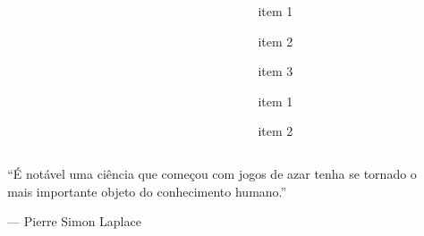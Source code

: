 \documentclass[
]{book}
\begin{document}
\begin{columns}

\begin{column}

\end{column}

\begin{column}

~

\end{column}

\begin{column}

item 1

item 2

item 3

item 1

item 2

\end{column}

\end{columns}

\begin{columns}

\begin{column}

\end{column}

\begin{column}

~

\end{column}

\begin{column}

``É notável uma ciência que começou com jogos de azar tenha se tornado o mais importante objeto do conhecimento humano.''

--- Pierre Simon Laplace

\end{column}

\end{columns}

\begin{columns}

\begin{column}

\end{column}

\begin{column}

~

\end{column}

\begin{column}

\end{column}

\end{columns}
\end{document}
